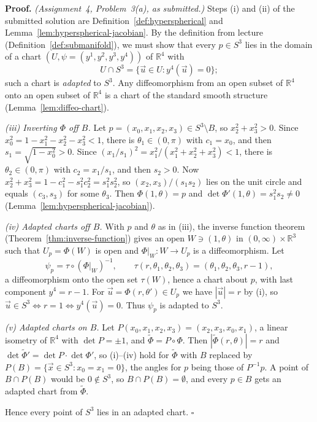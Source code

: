 \documentclass[11pt]{report}
\renewenvironment{proof}[1][Proof]{\noindent\textbf{#1.} }{\hfill$\square$\par\vspace{5pt}}
\begin{document}
\begin{proof}
\textit{(Assignment~4, Problem~3(a), as submitted.)} Steps (i) and (ii) of the submitted solution are Definition~\ref{def:hyperspherical} and Lemma~\ref{lem:hyperspherical-jacobian}. By the definition from lecture (Definition~\ref{def:submanifold}), we must show that every $p \in S^3$ lies in the domain of a chart $(U, \psi = (y^1, y^2, y^3, y^4))$ of $\mathbb{R}^4$ with
\[
U \cap S^3 = \{ \vec u \in U : y^4(\vec u) = 0 \};
\]
such a chart is \emph{adapted} to $S^3$. Any diffeomorphism from an open subset of $\mathbb{R}^4$ onto an open subset of $\mathbb{R}^4$ is a chart of the standard smooth structure (Lemma~\ref{lem:diffeo-chart}).

\emph{(iii) Inverting $\Phi$ off $B$.} Let $p = (x_0, x_1, x_2, x_3) \in S^3 \setminus B$, so $x_2^2 + x_3^2 > 0$. Since $x_0^2 = 1 - x_1^2 - x_2^2 - x_3^2 < 1$, there is $\theta_1 \in (0, \pi)$ with $c_1 = x_0$, and then $s_1 = \sqrt{1 - x_0^2} > 0$. Since $(x_1/s_1)^2 = x_1^2 / (x_1^2 + x_2^2 + x_3^2) < 1$, there is $\theta_2 \in (0, \pi)$ with $c_2 = x_1/s_1$, and then $s_2 > 0$. Now $x_2^2 + x_3^2 = 1 - c_1^2 - s_1^2 c_2^2 = s_1^2 s_2^2$, so $(x_2, x_3)/(s_1 s_2)$ lies on the unit circle and equals $(c_3, s_3)$ for some $\theta_3$. Then $\Phi(1, \theta) = p$ and $\det \Phi'(1, \theta) = s_1^2 s_2 \neq 0$ (Lemma~\ref{lem:hyperspherical-jacobian}).

\emph{(iv) Adapted charts off $B$.} With $p$ and $\theta$ as in (iii), the inverse function theorem (Theorem~\ref{thm:inverse-function}) gives an open $W \ni (1, \theta)$ in $(0, \infty) \times \mathbb{R}^3$ such that $U_p = \Phi(W)$ is open and $\Phi|_W : W \to U_p$ is a diffeomorphism. Let
\[
\psi_p = \tau \circ (\Phi|_W)^{-1}, \qquad \tau(r, \theta_1, \theta_2, \theta_3) = (\theta_1, \theta_2, \theta_3, r - 1),
\]
a diffeomorphism onto the open set $\tau(W)$, hence a chart about $p$, with last component $y^4 = r - 1$. For $\vec u = \Phi(r, \theta') \in U_p$ we have $|\vec u| = r$ by (i), so $\vec u \in S^3 \iff r = 1 \iff y^4(\vec u) = 0$. Thus $\psi_p$ is adapted to $S^3$.

\emph{(v) Adapted charts on $B$.} Let $P(x_0, x_1, x_2, x_3) = (x_2, x_3, x_0, x_1)$, a linear isometry of $\mathbb{R}^4$ with $\det P = \pm 1$, and $\tilde\Phi = P \circ \Phi$. Then $|\tilde\Phi(r, \theta)| = r$ and $\det \tilde\Phi' = \det P \cdot \det \Phi'$, so (i)--(iv) hold for $\tilde\Phi$ with $B$ replaced by $P(B) = \{ \vec x \in S^3 : x_0 = x_1 = 0 \}$, the angles for $p$ being those of $P^{-1}p$. A point of $B \cap P(B)$ would be $0 \notin S^3$, so $B \cap P(B) = \emptyset$, and every $p \in B$ gets an adapted chart from $\tilde\Phi$.

Hence every point of $S^3$ lies in an adapted chart.
\end{proof}
\end{document}
